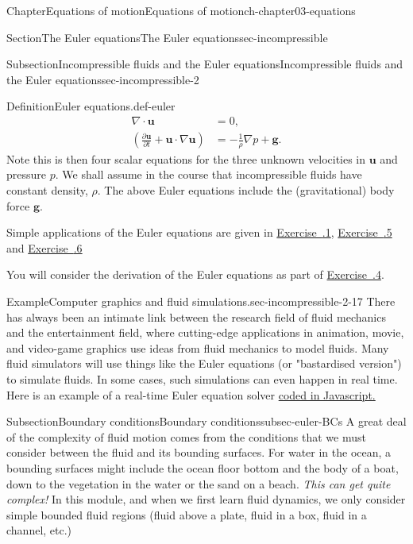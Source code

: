 \documentclass[oneside,10pt,]{book}
\newcommand{\xreffont}{\relax}
\numberwithin{equation}{section}
\newcommand{\pd}[2]{\frac{\partial#1}{\partial#2}}
\newcommand{\bu}{\boldsymbol{u}}
\newcommand{\bg}{\boldsymbol{g}}
\begin{document}
\begin{chapterptx}{Chapter}{Equations of motion}{}{Equations of motion}{}{}{ch-chapter03-equations}
\begin{sectionptx}{Section}{The Euler equations}{}{The Euler equations}{}{}{sec-incompressible}
\begin{subsectionptx}{Subsection}{Incompressible fluids and the Euler equations}{}{Incompressible fluids and the Euler equations}{}{}{sec-incompressible-2}
\begin{definition}{Definition}{Euler equations.}{def-euler}
\begin{align}
\nabla \cdot \bu &= 0, \label{def-euler-2-1-4-1}\\
\left(\pd{\bu}{t} + \bu \cdot \nabla\bu\right) &= - \frac{1}{\rho}\nabla p + \bg.\label{eqn-euler-momentum}
\end{align}
Note this is then four scalar equations for the three unknown velocities in \(\bu\) and pressure \(p\). We shall assume in the course that incompressible fluids have constant density, \(\rho\). The above Euler equations include the (gravitational) body force \(\bg\).%
\end{definition}
Simple applications of the Euler equations are given in \hyperlink{ex-kelvin-circulation-theorem}{Exercise~{\xreffont 6.3.1}}, \hyperlink{ex-fluid-pressure-uniform-velocity}{Exercise~{\xreffont 3.6.5}} and \hyperlink{ex-piston-fluid-problem}{Exercise~{\xreffont 3.6.6}}%
\par
You will consider the derivation of the Euler equations as part of \hyperlink{ex-euler-check}{Exercise~{\xreffont 3.6.4}}.%
\begin{example}{Example}{Computer graphics and fluid simulations.}{sec-incompressible-2-17}%
There has always been an intimate link between the research field of fluid mechanics and the entertainment field, where cutting-edge applications in animation, movie, and video-game graphics use ideas from fluid mechanics to model fluids. Many fluid simulators will use things like the Euler equations (or "bastardised version") to simulate fluids. In some cases, such simulations can even happen in real time. Here is an example of a real-time Euler equation solver \href{https://matthias-research.github.io/pages/tenMinutePhysics/17-fluidSim.html}{coded in Javascript.}%
\end{example}
\end{subsectionptx}
%
%
\typeout{************************************************}
\typeout{************************************************}
%
\begin{subsectionptx}{Subsection}{Boundary conditions}{}{Boundary conditions}{}{}{subsec-euler-BCs}
%
A great deal of the complexity of fluid motion comes from the conditions that we must consider between the fluid and its bounding surfaces. For water in the ocean, a bounding surfaces might include the ocean floor bottom and the body of a boat, down to the vegetation in the water or the sand on a beach. \emph{This can get quite complex!} In this module, and when we first learn fluid dynamics, we only consider simple bounded fluid regions (fluid above a plate, fluid in a box, fluid in a channel, etc.)%

\end{subsectionptx}
\end{sectionptx}
\end{chapterptx}
\end{document}
